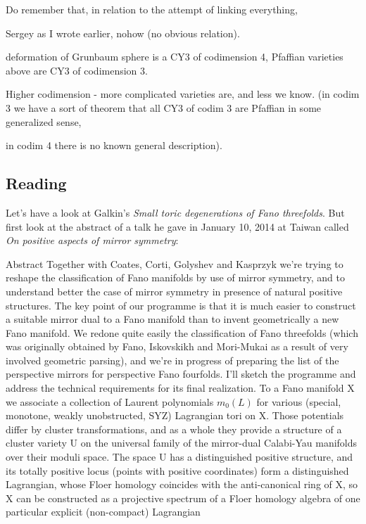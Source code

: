 {\color{2}Do remember} that, in relation to the attempt of linking everything,

\begin{thing14}{Sergey}\leavevmode
	as I wrote earlier, nohow (no obvious relation).

deformation of Grunbaum sphere is a CY3 of codimension 4,
Pfaffian varieties above are CY3 of codimension 3.

Higher codimension - {\color{4}more complicated varieties are}, and less we know.
(in codim 3 we have a sort of theorem that all CY3 of codim 3 are Pfaffian in some generalized sense,

in codim 4 there is no known general description).
\end{thing14}

\subsection{Reading \cite{galkin1}}

Let's have a look at Galkin's \cite{galkin1} \textit{Small toric degenerations of Fano threefolds}. But first look at the abstract of a talk he gave in January 10, 2014 at Taiwan called \textit{On positive aspects of mirror symmetry}:

\begin{thing4}{Abstract}\leavevmode
Together with Coates, Corti, Golyshev and Kasprzyk we're trying to reshape the classification of Fano manifolds by use of mirror symmetry, and to understand better the case of mirror symmetry in presence of natural positive structures. The key point of our programme is that it is much easier to construct a suitable mirror dual to a Fano manifold than to invent geometrically a new Fano manifold. We redone quite easily the classification of Fano threefolds (which was originally obtained by Fano, Iskovskikh and Mori-Mukai as a result of very involved geometric parsing), and we're in progress of preparing the list of the perspective mirrors for perspective Fano fourfolds. I'll sketch the programme and address the technical requirements for its final realization. To a Fano manifold X we associate a collection of Laurent polynomials $m_0(L)$ for various (special, monotone, weakly unobstructed, SYZ) Lagrangian tori on X. Those potentials differ by cluster transformations, and as a whole they provide a structure of a cluster variety U on the universal family of the mirror-dual Calabi-Yau manifolds over their moduli space. The space U has a distinguished positive structure, and its totally positive locus (points with positive coordinates) form a distinguished Lagrangian, whose Floer homology coincides with the anti-canonical ring of X, so X can be constructed as a projective spectrum of a Floer homology algebra of one particular explicit (non-compact) Lagrangian	
\end{thing4}

